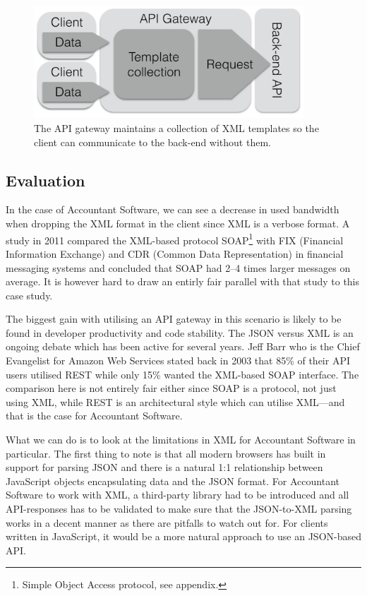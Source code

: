 \documentclass{cslthse-msc}
\begin{document}
\begin{figure}[H]
  \centering
    \begin{center}
      \includegraphics[width=0.9\textwidth]{images/gateway_templates.png}
    \end{center}
  \caption{The API gateway maintains a collection of XML templates so the client can communicate to the back-end without them.}
\end{figure}

\subsection{Evaluation}

In the case of Accountant Software, we can see a decrease in used bandwidth when dropping the XML format in the client since XML is a verbose format. A study in 2011 compared the XML-based protocol SOAP\footnote{Simple Object Access protocol, see appendix.} with FIX (Financial Information Exchange) and CDR (Common Data Representation) in financial messaging systems and concluded that SOAP had 2--4 times larger messages on average\cite{soap_fix}. It is however hard to draw an entirly fair parallel with that study to this case study.

The biggest gain with utilising an API gateway in this scenario is likely to be found in developer productivity and code stability. The JSON versus XML is an ongoing debate which has been active for several years. Jeff Barr who is the Chief Evangelist for Amazon Web Services stated back in 2003 that 85\% of their API users utilised REST while only 15\% wanted the XML-based SOAP interface\cite{soap_amazon}. The comparison here is not entirely fair either since SOAP is a protocol, not just using XML, while REST is an architectural style which can utilise XML---and that is the case for Accountant Software.

What we can do is to look at the limitations in XML for Accountant Software in particular. The first thing to note is that all modern browsers has built in support for parsing JSON and there is a natural 1:1 relationship between JavaScript objects encapsulating data and the JSON format. For Accountant Software to work with XML, a third-party library had to be introduced and all API-responses has to be validated to make sure that the JSON-to-XML parsing works in a decent manner as there are pitfalls to watch out for. For clients written in JavaScript, it would be a more natural approach to use an JSON-based API. 
\end{document}
